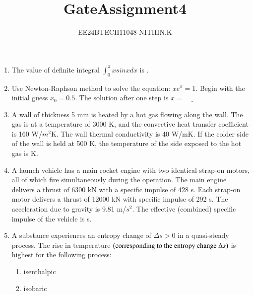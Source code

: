 \documentclass[journal]{IEEEtran}
\numberwithin{equation}{enumi}
\numberwithin{figure}{enumi}
\begin{document}


\title{GateAssignment4}
\author{EE24BTECH11048-NITHIN.K} 
{\let\newpage\relax\maketitle}
\begin{enumerate}
\section{Q.26 to Q.55 carry two marks each}

\item The value of definite integral $\int_{0}^{\pi}xsinxdx$ is \underline{\hspace{1cm}}.
\item Use Newton-Raphson method to solve the equation: $xe^x = 1$. Begin with the initial guess $x_0 = 0.5$. The solution after one step is $x = \underline{\hspace{1cm}}$
\item A wall of thickness 5 mm is heated by a hot gas flowing along the wall. The gas is at a temperature of 3000 K, and the convective heat transfer coefficient is 160 W/$m^2$K. The wall thermal conductivity is 40 W/mK. If the colder side of the wall is held at 500 K, the temperature of the side exposed to the hot gas is \underline{\hspace{1cm}} K.
\item A launch vehicle has a main rocket engine with two identical strap-on motors, all of which fire simultaneously during the operation. The main engine delivers a thrust of 6300 kN with a specific impulse of 428 s. Each strap-on motor delivers a thrust of 12000 kN with specific impulse of 292 s. The acceleration due to gravity is 9.81 m/$s^2$. The effective (combined) specific impulse of the vehicle is \underline{\hspace{1cm}} s.
\item A substance experiences an entropy change of $\Delta s > 0$ in a quasi-steady process. The rise in temperature $\left(\text{corresponding to the entropy change }\Delta s\right)$ is highest for the following process:
\begin{enumerate}
\item isenthalpic
\item isobaric

\end{enumerate}
\end{enumerate}
\end{document}
